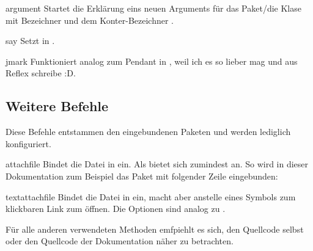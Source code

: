 \documentclass{sopra-base}
\begin{document}
\begin{environment}{argument}{}
    Startet die Erklärung eins neuen Arguments für das Paket/die Klase mit Bezeichner  und dem Konter-Bezeichner .
\end{environment}

\begin{command}{say}{}
    Setzt  in .
\end{command}

\begin{command}{jmark}{}
    Funktioniert analog zum Pendant in , weil ich es so lieber mag und aus Reflex schreibe :D.
\end{command}

\subsection{Weitere Befehle}

Diese Befehle entstammen den eingebundenen Paketen und werden lediglich konfiguriert.

\begin{command}{attachfile}{}
    Bindet die Datei in  ein. Als  bietet sich zumindest  an. So wird in dieser Dokumentation zum Beispiel das Paket mit folgender Zeile eingebunden:
\begin{plainlatex}
\end{plainlatex}
\end{command}

\begin{command}{textattachfile}{}
    Bindet die Datei in  ein, macht aber anstelle eines Symbols  zum klickbaren Link zum öffnen. Die Optionen sind analog zu .
\end{command}

Für alle anderen verwendeten Methoden emfpiehlt es sich, den Quellcode selbst oder den Quellcode der Dokumentation näher zu betrachten.
\end{document}
